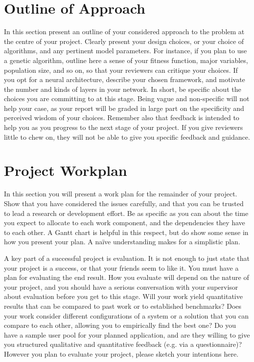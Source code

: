 \documentclass[]{UCD_CS_FYP_Report}
\begin{document}
\chapter{Outline of Approach}
In this section present an outline of your considered approach to the problem at the centre of your project. Clearly present your design choices, or your choice of algorithms, and any pertinent model parameters. For instance, if you plan to use a genetic algorithm, outline here a sense of your fitness function, major variables, population size, and so on, so that your reviewers can critique your choices. If you opt for a neural architecture, describe your chosen framework, and motivate the number and kinds of layers in your network. In short, be specific about the choices you are committing to at this stage. Being vague and non-specific will not help your case, as your report will be graded in large part on the specificity and perceived wisdom of your choices. Remember also that feedback is intended to help you as you progress to the next stage of your project. If you give reviewers little to chew on, they will not be able to give you specific feedback and guidance.


\chapter{Project Workplan}
In this section you will present a work plan for the remainder of your project. Show that you have considered the issues carefully, and that you can be trusted to lead a research or development effort. Be as specific as you can about the time you expect to allocate to each work component, and the dependencies they have to each other. A Gantt chart is helpful in this respect, but do show some sense in how you present your plan. A naïve understanding makes for a simplistic plan.

A key part of a successful project is evaluation. It is not enough to just state that your project is a success, or that your friends seem to like it. You must have a plan for evaluating the end result. How you evaluate will depend on the nature of your project, and you should have a serious conversation with your supervisor about evaluation before you get to this stage. Will your work yield quantitative results that can be compared to past work or to established benchmarks? Does your work consider different configurations of a system or a solution that you can compare to each other, allowing you to empirically find the best one? Do you have a sample user pool for your planned application, and are they willing to give you structured qualitative and quantitative feedback (e.g. via a questionnaire)? However you plan to evaluate your project, please sketch your intentions here.
\end{document}

